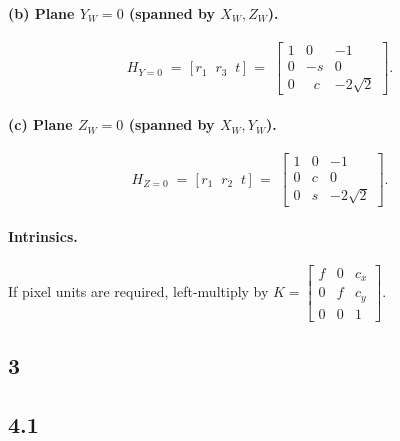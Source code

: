 \documentclass[12pt]{article}
\begin{document}
\paragraph{(b) Plane $Y_W=0$ (spanned by $X_W,Z_W$).}
\[
H_{Y=0} \;=\; \big[\, r_1 \;\; r_3 \;\; t \,\big]
\;=\;
\begin{bmatrix}
1 & 0 & -1\\
0 & -s & 0\\
0 & \;\;c & -2\sqrt{2}
\end{bmatrix}.
\]

\paragraph{(c) Plane $Z_W=0$ (spanned by $X_W,Y_W$).}
\[
H_{Z=0} \;=\; \big[\, r_1 \;\; r_2 \;\; t \,\big]
\;=\;
\begin{bmatrix}
1 & 0 & -1\\
0 & c & 0\\
0 & s & -2\sqrt{2}
\end{bmatrix}.
\]

\paragraph{Intrinsics.}
If pixel units are required, left-multiply by $K=\begin{bmatrix}f&0&c_x\\0&f&c_y\\0&0&1\end{bmatrix}$.


\subsection*{3}


\subsection*{4.1}
\end{document}
